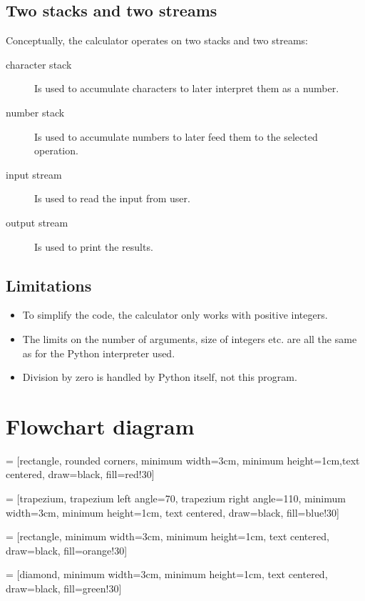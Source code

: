 \documentclass[11pt]{article}
\begin{document}
\subsection{Two stacks and two streams}
\label{sec-1-2}
Conceptually, the calculator operates on two stacks and two streams:

\begin{description}
\item[{character stack}] Is used to accumulate characters to later
interpret them as a number.
\item[{number stack}] Is used to accumulate numbers to later feed them
to the selected operation.

\item[{input stream}] Is used to read the input from user.
\item[{output stream}] Is used to print the results.
\end{description}

\subsection{Limitations}
\label{sec-1-3}
\begin{itemize}
\item To simplify the code, the calculator only works with positive
integers.
\item The limits on the number of arguments, size of integers etc. are
all the same as for the Python interpreter used.
\item Division by zero is handled by Python itself, not this program.
\end{itemize}

\section{Flowchart diagram}
\label{sec-2}

 = [rectangle, rounded corners, minimum
  width=3cm, minimum height=1cm,text centered, draw=black,
  fill=red!30]

 = [trapezium, trapezium left angle=70, trapezium right
  angle=110, minimum width=3cm, minimum height=1cm, text centered,
  draw=black, fill=blue!30]

 = [rectangle, minimum width=3cm, minimum
  height=1cm, text centered, draw=black, fill=orange!30]

 = [diamond, minimum width=3cm, minimum
  height=1cm, text centered, draw=black, fill=green!30]
\end{document}
